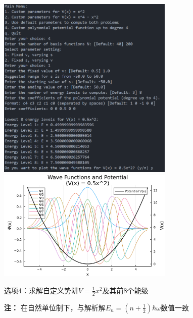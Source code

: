 \begin{figure}[H]
	\centering
	\includegraphics[width=0.75\textwidth]{Problem_3/figs/choice_4.png}
    \hspace{5pt}
    \includegraphics[width=0.75\textwidth]{Problem_3/figs/plot_3.png}
	\caption{选项4：求解自定义势阱$V=\frac{1}{2}x^2$及其前$8$个能级}
	\caption*{\footnotesize{\textbf{注：} 在自然单位制下，与解析解$E_n = (n+\frac{1}{2})\hbar \omega$数值一致}}
\end{figure}

